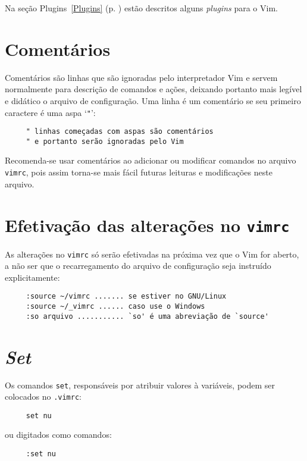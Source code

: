 Na seção Plugins~\ref{Plugins} (p. \pageref{Plugins}) estão descritos alguns
{\em plugins} para o Vim.

\section{Comentários }
\label{Comentários }

Comentários são linhas que são ignoradas pelo interpretador Vim e servem
normalmente para descrição de comandos e ações, deixando portanto mais legível
e didático o arquivo de configuração. Uma linha é um comentário se seu
primeiro caractere é uma aspa `\verb+"+':

\begin{verbatim}
     " linhas começadas com aspas são comentários
     " e portanto serão ignoradas pelo Vim
\end{verbatim}

Recomenda-se usar comentários ao adicionar ou modificar comandos no arquivo
{\tt vimrc}, pois assim torna-se mais fácil futuras leituras e modificações
neste arquivo.

\section{Efetivação das alterações no {\tt vimrc}}
\label{Efetivação das alterações no vimrc}

As alterações no {\tt vimrc} só serão efetivadas na próxima vez que o Vim for
aberto, a não ser que o recarregamento do arquivo de configuração seja
instruído explicitamente:

\begin{verbatim}
     :source ~/vimrc ....... se estiver no GNU/Linux
     :source ~/_vimrc ...... caso use o Windows
     :so arquivo ........... `so' é uma abreviação de `source'
\end{verbatim}

\section{{\em Set}}
\label{Set}

Os comandos {\tt set}, responsáveis por atribuir valores à variáveis,
 podem ser colocados no \verb|.vimrc|:

\begin{verbatim}
     set nu
\end{verbatim}

ou digitados como comandos:

\begin{verbatim}
     :set nu
\end{verbatim}


